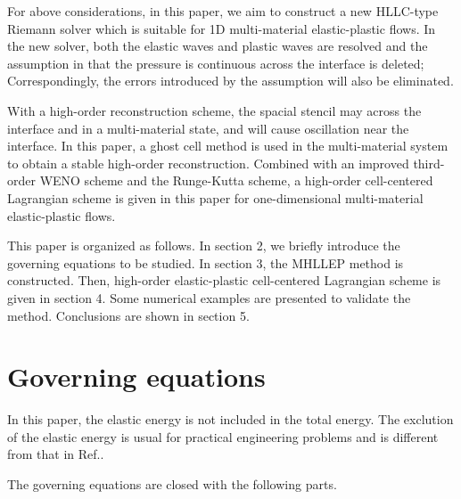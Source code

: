 \documentclass{article}
\numberwithin{equation}{section}
\numberwithin{table}{section}
\begin{document}
For above considerations, in this paper, we aim to construct a new HLLC-type Riemann solver which is suitable for 1D multi-material elastic-plastic flows. In the new solver, both the elastic waves and plastic waves are resolved and the assumption in \cite{cheng2016harten} that the pressure is continuous across the interface is deleted; Correspondingly, the errors introduced by the assumption will also be eliminated.

With a high-order reconstruction scheme,  the spacial stencil may across the interface and in a multi-material state, and  will cause oscillation near the interface. In this paper, a ghost cell method is used  in the  multi-material system to obtain a stable high-order reconstruction.   Combined with an improved third-order WENO scheme\cite{liu2018novel} and the  Runge-Kutta scheme, a high-order cell-centered Lagrangian scheme is given in this paper for one-dimensional multi-material elastic-plastic flows.

This paper is organized as follows. In section 2, we briefly introduce the governing equations to be studied. In section 3, the MHLLEP method is constructed.  Then, high-order elastic-plastic cell-centered Lagrangian scheme is given in section 4. Some numerical examples are presented to validate the method.  Conclusions are shown in section 5.
\section{Governing equations}
In this paper, the elastic energy is not included in the total energy. The exclution of the elastic energy is usual for practical engineering problems \cite{maire2013nominally} and is different from that in Ref.\cite{gavrilyuk2008modelling}. 

The governing equations are closed with the following parts.
\end{document}
